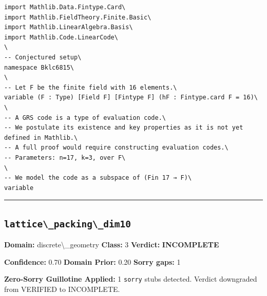 \documentclass[12pt,a4paper]{article}
\begin{document}
\begin{lstlisting}[caption={Lean 4 Sketch (v14 Galois)}]
import Mathlib.Data.Fintype.Card\
import Mathlib.FieldTheory.Finite.Basic\
import Mathlib.LinearAlgebra.Basis\
import Mathlib.Code.LinearCode\
\
-- Conjectured setup\
namespace Bklc6815\
\
-- Let F be the finite field with 16 elements.\
variable (F : Type) [Field F] [Fintype F] (hF : Fintype.card F = 16)\
\
-- A GRS code is a type of evaluation code.\
-- We postulate its existence and key properties as it is not yet defined in Mathlib.\
-- A full proof would require constructing evaluation codes.\
-- Parameters: n=17, k=3, over F\
\
-- We model the code as a subspace of (Fin 17 → F)\
variable 
\end{lstlisting}

\hrule\medskip

\subsection*{\texttt{lattice\textbackslash{}_packing\textbackslash{}_dim10}}

\textbf{Domain:} discrete\textbackslash{}_geometry \quad \textbf{Class:} 3 \quad \textbf{Verdict:} \textcolor{incompleteamber}{\textbf{INCOMPLETE}}

\textbf{Confidence:} 0.70 \quad \textbf{Domain Prior:} 0.20 \quad \textbf{Sorry gaps:} 1

\textcolor{sorryred}{\textbf{Zero-Sorry Guillotine Applied:} 1 \texttt{sorry} stubs detected. Verdict downgraded from VERIFIED to INCOMPLETE.}
\end{document}
